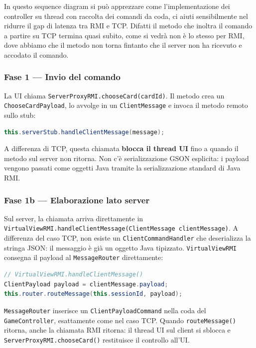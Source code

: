 \documentclass[11pt,a4paper]{article}
\begin{document}
In questo sequence diagram si può apprezzare come l'implementazione dei controller
su thread con raccolta dei comandi da coda, ci aiuti sensibilmente nel ridurre il gap di 
latenza tra RMI e TCP. Difatti il metodo che inoltra il comando a partire su TCP termina quasi subito,
come si vedrà non è lo stesso per RMI, dove abbiamo che il metodo non torna fintanto che il 
server non ha ricevuto e accodato il comando.

\subsubsection*{Fase 1 — Invio del comando}

La UI chiama \texttt{ServerProxyRMI.chooseCard(cardId)}. Il metodo
crea un \texttt{ChooseCardPayload}, lo avvolge in un \texttt{ClientMessage} e
invoca il metodo remoto sullo stub:

\begin{lstlisting}[language=Java]
this.serverStub.handleClientMessage(message); 
\end{lstlisting}

A differenza di TCP, questa chiamata \textbf{blocca il thread UI} fino a
quando il metodo sul server non ritorna. Non c'è serializzazione GSON esplicita:
i payload vengono passati come oggetti Java tramite la serializzazione standard
di Java RMI.

\subsubsection*{Fase 1b — Elaborazione lato server}

Sul server, la chiamata arriva direttamente in
\texttt{VirtualViewRMI.handleClientMessage(ClientMessage clientMessage)}.
A differenza del caso TCP, non esiste un \texttt{ClientCommandHandler} che
deserializza la stringa JSON: il messaggio è già un oggetto Java tipizzato.
\texttt{VirtualViewRMI} consegna il payload al \texttt{MessageRouter}
direttamente:

\begin{lstlisting}[language=Java]
// VirtualViewRMI.handleClientMessage()
ClientPayload payload = clientMessage.payload;
this.router.routeMessage(this.sessionId, payload);
\end{lstlisting}

\texttt{MessageRouter} inserisce un \texttt{ClientPayloadCommand} nella coda
del \texttt{GameController}, esattamente come nel caso TCP.
Quando \texttt{routeMessage()} ritorna, anche la chiamata RMI ritorna:
il thread UI sul client si sblocca e \texttt{ServerProxyRMI.chooseCard()}
restituisce il controllo all'UI.
\end{document}
